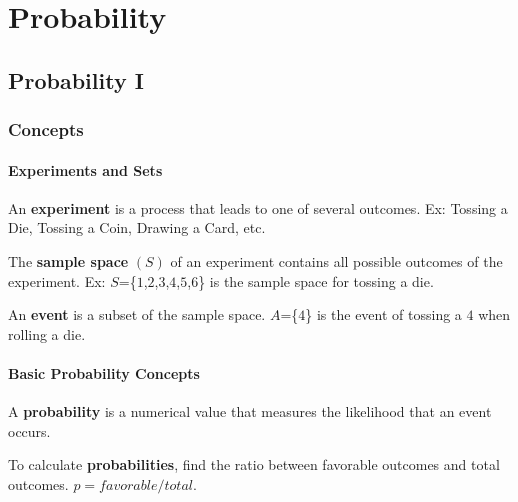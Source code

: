 \documentclass[
  letterpaper,
  DIV=11,
  numbers=noendperiod]{scrreprt}
\begin{document}
\part{Probability}

\hypertarget{probability-i}{%
\chapter{Probability I}\label{probability-i}}

\hypertarget{concepts-7}{%
\section{Concepts}\label{concepts-7}}

\hypertarget{experiments-and-sets}{%
\subsection*{Experiments and Sets}\label{experiments-and-sets}}

An \textbf{experiment} is a process that leads to one of several
outcomes. Ex: Tossing a Die, Tossing a Coin, Drawing a Card, etc.

The \textbf{sample space} \((S)\) of an experiment contains all possible
outcomes of the experiment. Ex:
\(S\)=\{\(1\),\(2\),\(3\),\(4\),\(5\),\(6\)\} is the sample space for
tossing a die.

An \textbf{event} is a subset of the sample space. \(A\)=\{\(4\)\} is
the event of tossing a \(4\) when rolling a die.

\hypertarget{basic-probability-concepts}{%
\subsection*{Basic Probability
Concepts}\label{basic-probability-concepts}}

A \textbf{probability} is a numerical value that measures the likelihood
that an event occurs.

To calculate \textbf{probabilities}, find the ratio between favorable
outcomes and total outcomes. \(p=favorable/total\).
\end{document}
